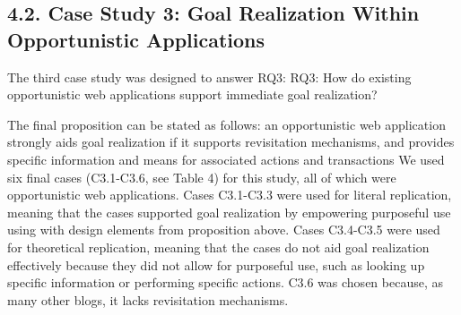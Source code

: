 \documentclass{casconpaper}
\begin{document}
{\subsection{4.2. Case Study 3: Goal Realization Within Opportunistic Applications}
The third case study was designed to answer RQ3:
RQ3: How do existing opportunistic web applications support immediate goal realization?

The final proposition can be stated as follows: an opportunistic web application strongly aids goal realization if it supports revisitation mechanisms, and provides specific information and means for associated actions and transactions We used six final cases (C3.1-C3.6, see Table 4) for this study, all of which were opportunistic web applications. Cases C3.1-C3.3 were used for literal replication, meaning that the cases supported goal realization by empowering purposeful use using with design elements from proposition above. Cases C3.4-C3.5 were used for theoretical replication, meaning that the cases do not aid goal realization effectively because they did not allow for purposeful use, such as looking up specific information or performing specific actions. C3.6 was chosen because, as many other blogs, it lacks revisitation mechanisms. 

} %
\end{document}
